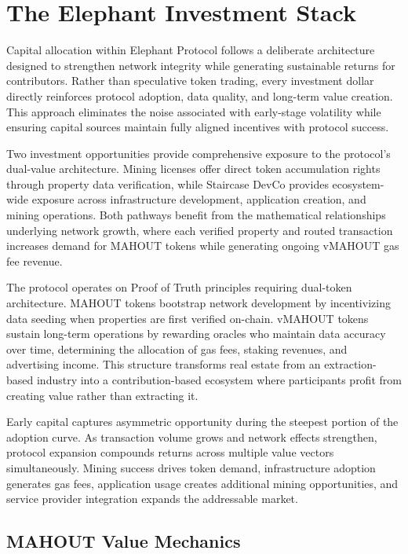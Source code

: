 \chapter{The Elephant Investment Stack}

Capital allocation within Elephant Protocol follows a deliberate architecture designed to strengthen network integrity while generating sustainable returns for contributors. Rather than speculative token trading, every investment dollar directly reinforces protocol adoption, data quality, and long-term value creation. This approach eliminates the noise associated with early-stage volatility while ensuring capital sources maintain fully aligned incentives with protocol success.

Two investment opportunities provide comprehensive exposure to the protocol's dual-value architecture. Mining licenses offer direct token accumulation rights through property data verification, while Staircase DevCo provides ecosystem-wide exposure across infrastructure development, application creation, and mining operations. Both pathways benefit from the mathematical relationships underlying network growth, where each verified property and routed transaction increases demand for MAHOUT tokens while generating ongoing vMAHOUT gas fee revenue.

The protocol operates on Proof of Truth principles requiring dual-token architecture. MAHOUT tokens bootstrap network development by incentivizing data seeding when properties are first verified on-chain. vMAHOUT tokens sustain long-term operations by rewarding oracles who maintain data accuracy over time, determining the allocation of gas fees, staking revenues, and advertising income. This structure transforms real estate from an extraction-based industry into a contribution-based ecosystem where participants profit from creating value rather than extracting it.

Early capital captures asymmetric opportunity during the steepest portion of the adoption curve. As transaction volume grows and network effects strengthen, protocol expansion compounds returns across multiple value vectors simultaneously. Mining success drives token demand, infrastructure adoption generates gas fees, application usage creates additional mining opportunities, and service provider integration expands the addressable market.

\section{MAHOUT Value Mechanics}

